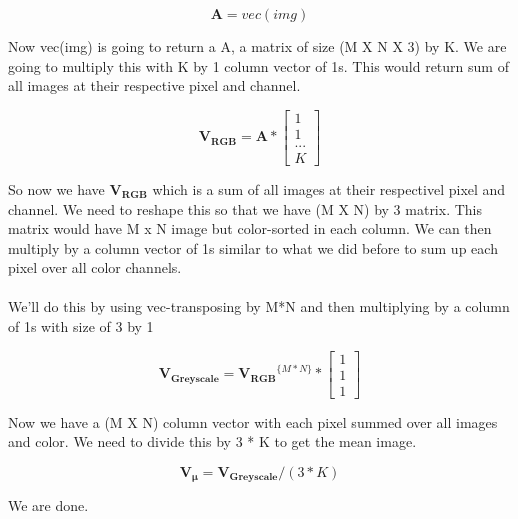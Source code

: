 \documentclass{article}
\newcommand{\matr}[1]{\mathbf{#1}}
\begin{document}
		\begin{equation*}
		\matr{A} = vec(img)
		\end{equation*}

		Now vec(img) is going to return a A, a matrix of size (M X N X 3) by K. We are going to multiply this with K by 1 column vector of 1s. 
		This would return sum of all images at their respective pixel and channel.

		\begin{equation*}
		\matr{V_{RGB}} = \matr{A} * 
						\begin{bmatrix} 
						1 \\ 1 \\ ... \\ K 
						\end{bmatrix} 
		\end{equation*}	
		
		So now we have $\matr{V_{RGB}}$ which is a sum of all images at their respectivel pixel and channel. We need to reshape this so that
		we have (M X N) by 3 matrix. This matrix would have M x N image but color-sorted in each column.  
		We can then multiply by a column vector of 1s similar to what we did before to sum up each pixel over all color channels. \\
		\\
		We'll do this by using vec-transposing by M*N and then multiplying by a column of 1s with size of 3 by 1

		\begin{equation*}
		\matr{V_{Greyscale}} = \matr{V_{RGB}}^{\{ M*N \}} * 
						\begin{bmatrix} 
						1 \\ 1 \\ 1  
						\end{bmatrix} 
		\end{equation*}	

		Now we have a (M X N) column vector with each pixel summed over all images and color. We need to divide this by 3 * K to get the mean
		image.

		\begin{equation*}
		\matr{V_{\mu}} = \matr{V_{Greyscale}} / (3*K) 
		\end{equation*}	

		We are done.

		\subsubsection{} %
	
\end{document}
